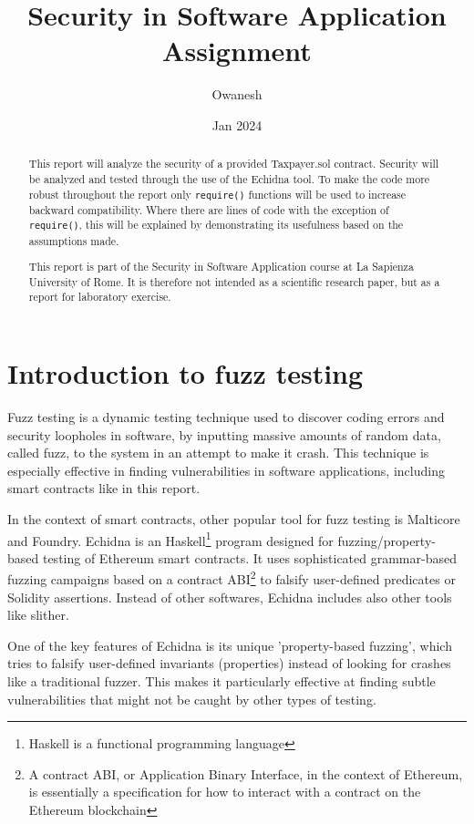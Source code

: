 \documentclass{article}
\title{Security in Software Application Assignment}
\author{Owanesh}
\date{Jan 2024}
\begin{document}
\maketitle

\begin{abstract}
    This report will analyze the security of a provided Taxpayer.sol 
    contract. Security will be analyzed and tested through the use of 
    the Echidna tool. To make the code more robust throughout the report 
    only \texttt{require()} functions will be used to 
    increase backward compatibility. Where there are lines of code with 
    the exception of \texttt{require()}, this will be 
    explained by demonstrating its usefulness based on the assumptions made.

    This report is part of the Security in Software Application course at La Sapienza University of Rome. It is therefore not intended as a scientific research paper, but as a report for laboratory exercise.
\end{abstract}

\tableofcontents

\section{Introduction to fuzz testing}
Fuzz testing is a dynamic testing technique used to discover coding 
errors and security loopholes in software, by inputting massive amounts 
of random data, called fuzz, to the system in an attempt to make it crash. 
This technique is especially effective in finding vulnerabilities in 
software applications, including smart contracts like in this report.

In the context of smart contracts, other popular tool for 
fuzz testing is Malticore and Foundry. Echidna is an Haskell\footnote{Haskell is a functional programming language} program designed 
for fuzzing/property-based testing of Ethereum smart contracts. 
It uses sophisticated grammar-based fuzzing campaigns based 
on a contract ABI\footnote{A contract ABI, or Application Binary Interface, in the context of Ethereum, is essentially a specification for how to interact with a contract on the Ethereum blockchain} to falsify user-defined predicates or Solidity assertions.
Instead of other softwares, Echidna includes also other tools like slither.

One of the key features of Echidna is its unique 'property-based fuzzing',
 which tries to falsify user-defined invariants (properties) 
 instead of looking for crashes like a traditional fuzzer. 
 This makes it particularly effective at finding subtle vulnerabilities that might not be caught by other types of testing.
\end{document}
